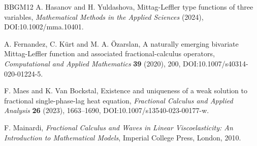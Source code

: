 \documentclass{amsart}
\numberwithin{equation}{section}
\begin{document}
\begin{thebibliography}{BBGM12}
A. Hasanov and H. Yuldashova, Mittag-Leffler type functions of three variables, \emph{Mathematical Methods in the Applied Sciences} (2024), DOI:10.1002/mma.10401.

A. Fernandez, C. Kürt and M. A. Özarslan, A naturally emerging bivariate Mittag-Leffler function and associated fractional-calculus operators, \emph{Computational and Applied Mathematics} \textbf{39} (2020), 200, DOI:10.1007/s40314-020-01224-5.

F. Maes and K. Van Bockstal, Existence and uniqueness of a weak solution to fractional single-phase-lag heat equation, \emph{Fractional Calculus and Applied Analysis} \textbf{26} (2023), 1663--1690, DOI:10.1007/s13540-023-00177-w.

F. Mainardi, \emph{Fractional Calculus and Waves in Linear Viscoelasticity: An Introduction to Mathematical Models}, Imperial College Press, London, 2010.
\end{thebibliography}
\end{document}
